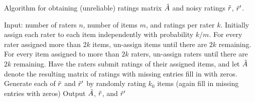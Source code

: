 \begin{algorithm}[t!]
\caption{Algorithm for obtaining (unreliable) ratings matrix $\tilde{A}$ and noisy 
ratings $\tilde{r}$, $\tilde{r}'$.}
\label{alg:create-A}
\begin{algorithmic}[1]
\State Input: number of raters $n$,  number of items $m$, and ratings per rater $k$.
\State Initially assign each rater to each item independently with probability $k/m$.  
\State For every rater assigned more than $2k$ items, un-assign items until 
       there are $2k$ remaining.
\State For every item assigned to more than $2k$
       raters, un-assign raters until there are $2k$ remaining.
\State Have the raters submit ratings of their assigned items, and let $\tilde{A}$ 
       denote the resulting matrix of ratings with missing entries fill in with 
       zeros.
\State Generate each of $\tilde{r}$ and $\tilde{r}'$ by randomly rating $k_0$ items (again fill in missing entries with zeros)
\State Output $\tilde{A}$, $\tilde{r}$, and $\tilde{r}'$
\end{algorithmic}
\end{algorithm}


